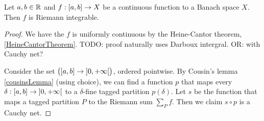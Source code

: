 \begin{proposition} \label{continuousFunctionOnIntervalRiemannIntegrable}
Let $a,b\in \mathbb{R}$ and $f:\interval{a,b}\to X$ be a continuous function to a Banach space $X$. Then $f$ is Riemann integrable.
\end{proposition}
\begin{proof}
We have the $f$ is uniformly continuous by the Heine-Cantor theorem, \ref{HeineCantorTheorem}. TODO: proof naturally uses Darboux intergral. OR: with Cauchy net?



Consider the set $\big(\interval{a,b}\to \interval[o]{0,+\infty}\big)$, ordered pointwise. By Cousin's lemma \ref{cousinsLemma} (using choice), we can find a function $p$ that maps every $\delta: \interval{a,b}\to \interval[o]{0,+\infty}$ to a $\delta$-fine tagged partition $p(\delta)$. Let $s$ be the function that maps a tagged partition $P$ to the Riemann sum $\sum_P f$. Then we claim $s\circ p$ is a Cauchy net.
\end{proof}



